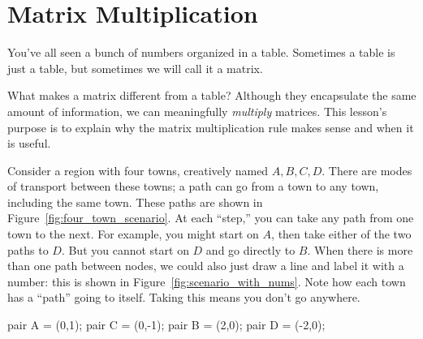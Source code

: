 \documentclass[../gatm.tex]{subfiles}
\begin{document}
\section{Matrix Multiplication}

\newcommand{\indsize}{\scriptsize}
\newcommand{\colind}[2]{\displaystyle\smash{\mathop{#1}^{\raisebox{.5\normalbaselineskip}{$#2$}}}}
\newcommand{\rowind}[1]{\mbox{$#1$}}

You've all seen a bunch of numbers organized in a table. Sometimes a table is just a table, but sometimes we will call it a matrix.

What makes a matrix different from a table? Although they encapsulate the same amount of information, we can meaningfully \textit{multiply} matrices. This lesson's purpose is to explain why the matrix multiplication rule makes sense and when it is useful.

Consider a region with four towns, creatively named $A,B,C,D$. There are modes of transport between these towns; a path can go from a town to any town, including the same town. These paths are shown in Figure~\ref{fig:four_town_scenario}. At each ``step,'' you can take any path from one town to the next. For example, you might start on $A$, then take either of the two paths to $D$. But you cannot start on $D$ and go directly to $B$. When there is more than one path between nodes, we could also just draw a line and label it with a number: this is shown in Figure~\ref{fig:scenario_with_nums}. Note how each town has a ``path'' going to itself. Taking this means you don't go anywhere.

\begin{asydef}
pair A = (0,1);
pair C = (0,-1);
pair B = (2,0);
pair D = (-2,0);
\end{asydef}
\end{document}
